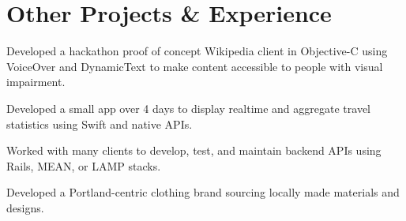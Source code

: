 \documentclass[]{jhearn-resume}
\begin{document}
\begin{minipage}[t]{0.64\textwidth}
\section{Other Projects \& Experience}

\begin{tightemize}
\item Developed a hackathon proof of concept Wikipedia client in Objective-C using VoiceOver and DynamicText to make content accessible to people with visual impairment.
\end{tightemize}
\sectionsep

\begin{tightemize}
\item Developed a small app over 4 days to display realtime and aggregate travel statistics using Swift and native APIs.
\end{tightemize}
\sectionsep


\begin{tightemize}
\item Worked with many clients to develop, test, and maintain backend APIs using Rails, MEAN, or LAMP stacks.
\end{tightemize}
\sectionsep

\begin{tightemize}
\item Developed a Portland-centric clothing brand sourcing locally made materials and designs.
\end{tightemize}
\sectionsep


\end{minipage}
\end{document}
